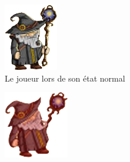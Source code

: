     \FloatBarrier
    \begin{figure}[h]
        \centering
        \begin{subfigure}[t]{0.45\textwidth}
            \centering
            \includegraphics[width=\textwidth]{image/feedback/feedback1.png}
            \caption{Le joueur lors de son état normal}
        \end{subfigure}
        \begin{subfigure}[t]{0.45\textwidth}
            \centering
            \includegraphics[width=\textwidth]{image/feedback/feedback2.png}

\end{subfigure}
\end{figure}
